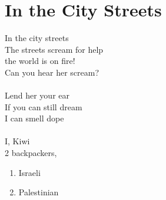 \documentclass[16pt,openany,oneside]{book}
\begin{document}
\chapter{In the City Streets}

In the city streets  \\
The streets scream for help \\
the world is on fire! \\
Can you hear her scream?
\\\\
Lend her your ear \\
If you can still dream   \\
I can smell dope 
\\\\
I, Kiwi\\
2 backpackers,

\begin{enumerate}
    \item Israeli
    \item Palestinian
\end{enumerate}
\end{document}
